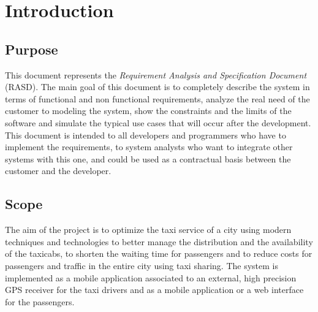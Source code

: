\chapter{Introduction} \label{chap1}

\section{Purpose}
This document represents the \textit{Requirement Analysis and Specification Document} (RASD). The main goal of this document is to completely describe the system in terms of functional and non functional requirements, analyze the real need of the customer to modeling the system, show the constraints and the limits of the software and simulate the typical use cases that will occur after the development. This document is intended to all developers and programmers who have to implement the requirements, to system analysts who want to integrate other systems with this one, and could be used as a contractual basis between the customer and the developer.

\section{Scope}
The aim of the project is to optimize the taxi service of a city using modern techniques and technologies to better manage the distribution and the availability of the taxicabs, to shorten the waiting time for passengers and to reduce costs for passengers and traffic in the entire city using taxi sharing. 
The system is implemented as a mobile application associated to an external, high precision GPS receiver for the taxi drivers and as a mobile application or a web interface for the passengers.

